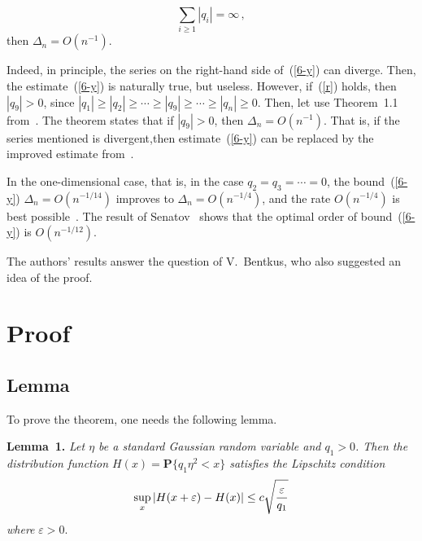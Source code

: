 \begin{multicols}{2}
    \noindent
    \begin{equation}
    \label{r}
    \sum\limits_{i\geq 1}|q_i|=\infty\,,  
    \end{equation}
    then $\Delta_{n}=O(n^{-1}).$

\smallskip

    Indeed, in principle, the series on the right-hand side of~(\ref{6-y}) 
    can diverge. Then, the estimate~(\ref{6-y}) is naturally
    true, but useless. However, if~(\ref{r}) holds, then $|q_9| >0$,
    since
    $|q_1| \geq |q_2| \geq\cdots\geq |q_9| \geq\cdots\geq |q_n| \geq0$. Then,
let use Theorem~1.1 from~\cite{1-y}. The theorem states that
    if $|q_9| >0$, then
     $\Delta_{n} =O(n^{-1})$. That is, if the series mentioned is
    divergent,then estimate~(\ref{6-y}) can be replaced by the
    improved estimate from~\cite{1-y}.


    In the one-dimensional case, that is, in the case
    $q_2 =q_3=\cdots =0$,
    the bound~(\ref{6-y}) $\Delta_{n} =O(n^{-1/14})$ improves to $\Delta_{n} =O(n^{-1/4})$, and
    the rate $O(n^{-1/4})$ is best possible~\cite{8-y}.
    The result of Senatov~\cite{6-y} shows that the optimal order of bound~(\ref{6-y}) 
    is $O(n^{-1/12})$.

    The authors' results answer the question of V.~Bentkus, who
    also suggested an idea of the proof.
    
    \vspace*{-6pt}


    \section{Proof}

    \vspace*{-2pt}

    \subsection{Lemma}

\noindent
    To prove the theorem, one needs the following lemma.

\smallskip

\noindent
\textbf{Lemma~1.} \textit{Let $\eta$ be a standard Gaussian random variable and $q_1>0$.
    Then the distribution function
    $H(x)=\textbf{P}\{q_1\eta^2<x\}$ satisfies the Lipschitz condition
       \begin{equation}
       \label{6l}
   \sup\limits_{x}|H(x+\varepsilon)-H(x)|\leq c\sqrt{\displaystyle\frac{\displaystyle \varepsilon\mathstrut}{\displaystyle q_1\mathstrut}}
    \end{equation}
    where} $\varepsilon >0$.


\end{multicols}
